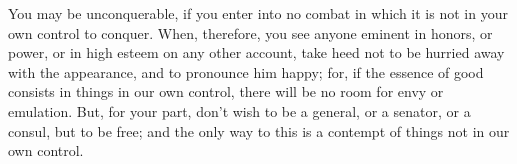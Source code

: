 You may  be unconquerable, if you  enter into no combat  in which it is  not in
your own control to conquer. When, therefore, you see anyone eminent in honors,
or power, or in  high esteem on any other account, take heed  not to be hurried
away with the  appearance, and to pronounce  him happy; for, if  the essence of
good consists in things  in our own control, there will be no  room for envy or
emulation. But, for your  part, don't wish to be a general, or  a senator, or a
consul, but to be free; and the only way to this is a contempt of things not in
our own control.
